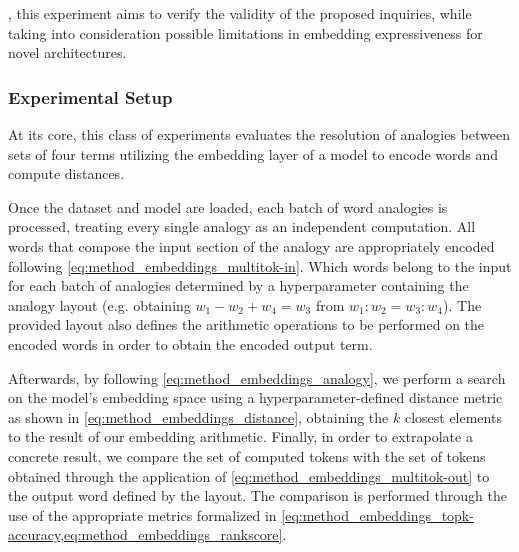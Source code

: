 , this experiment aims to verify the validity of the proposed inquiries, while taking into consideration possible limitations in embedding expressiveness for novel architectures.

\subsubsection{Experimental Setup}\label{sssec:exp_emb_exp1_expset}

At its core, this class of experiments evaluates the resolution of analogies between sets of four terms utilizing the embedding layer of a model to encode words and compute distances.

Once the dataset and model are loaded, each batch of word analogies is processed, treating every single analogy as an independent computation.
All words that compose the input section of the analogy are appropriately encoded following \cref{eq:method_embeddings_multitok-in}.
Which words belong to the input for each batch of analogies  determined by a hyperparameter containing the analogy layout (e.g. obtaining $w_1 - w_2 + w_4 = w_3$ from $w_1 : w_2 = w_3 : w_4$).
The provided layout also defines the arithmetic operations to be performed on the encoded words in order to obtain the encoded output term.

Afterwards, by following \cref{eq:method_embeddings_analogy}, we perform a search on the model's embedding space using a hyperparameter-defined distance metric as shown in \cref{eq:method_embeddings_distance}, obtaining the $k$ closest elements to the result of our embedding arithmetic.
Finally, in order to extrapolate a concrete result, we compare the set of computed tokens with the set of tokens obtained through the application of \cref{eq:method_embeddings_multitok-out} to the output word defined by the layout.
The comparison is performed through the use of the appropriate metrics formalized in \cref{eq:method_embeddings_topk-accuracy,eq:method_embeddings_rankscore}.

